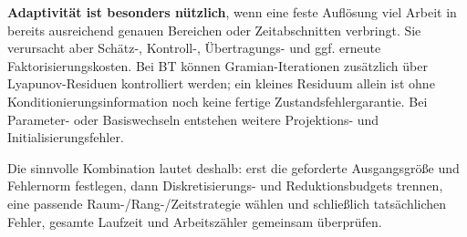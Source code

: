\textbf{Adaptivität ist besonders nützlich}, wenn eine feste Auflösung viel Arbeit in bereits ausreichend genauen Bereichen oder Zeitabschnitten verbringt. Sie verursacht aber Schätz-, Kontroll-, Übertragungs- und ggf. erneute Faktorisierungskosten. Bei BT können Gramian-Iterationen zusätzlich über Lyapunov-Residuen kontrolliert werden; ein kleines Residuum allein ist ohne Konditionierungsinformation noch keine fertige Zustandsfehlergarantie. Bei Parameter- oder Basiswechseln entstehen weitere Projektions- und Initialisierungsfehler.

Die sinnvolle Kombination lautet deshalb: erst die geforderte Ausgangsgröße und Fehlernorm festlegen, dann Diskretisierungs- und Reduktionsbudgets trennen, eine passende Raum-/Rang-/Zeitstrategie wählen und schließlich tatsächlichen Fehler, gesamte Laufzeit und Arbeitszähler gemeinsam überprüfen.
